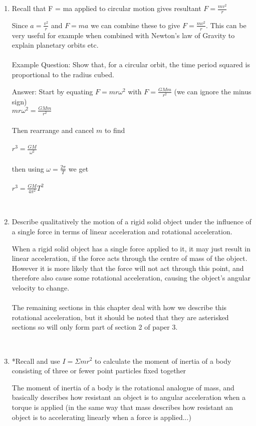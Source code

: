 \documentclass{article}
\begin{document}
\begin {enumerate}
\item Recall that F = ma applied to circular motion gives resultant $F=\frac{mv^2}{r}$

Since $a = \frac{v ^{2}}{r}$ and $F=ma$ we can combine these to give $F=\frac{mv^2}{r}$. This can be very useful for example when combined with Newton's law of Gravity to explain planetary orbits etc.
\\
\\

Example Question: Show that, for a circular orbit, the time period squared is proportional to the radius cubed.

Answer: Start by equating $F=mr\omega^2$ with $F= \frac{GMm}{r^2}$ (we can ignore the minus sign)
\\

$mr\omega^{2}= \frac{GMm}{r^2}$
\\
\\
Then rearrange and cancel $m$ to find
\\
\\
$r^{3}=\frac{GM}{\omega^2}$
\\
\\
then using $\omega=\frac{2\pi}{T}$ we get
\\
\\
$r^{3}=\frac{GM}{4\pi^{2}}T^2$

\
\item Describe qualitatively the motion of a rigid solid object under the influence of a single force in terms of
linear acceleration and rotational acceleration.

When a rigid solid object has a single force applied to it, it may just result in linear acceleration, if the force acts through the centre of mass of the object. However it is more likely that the force will not act through this point, and therefore also cause some rotational acceleration, causing the object's angular velocity to change.  
\\
\\
The remaining sections in this chapter deal with how we describe this rotational acceleration, but it should be noted that they are asterisked sections so will only form part of section 2 of paper 3.

\
\item *Recall and use $I = \Sigma mr^2$ to calculate the moment of inertia of a body consisting of three or fewer point
particles fixed together

The moment of inertia of a body is the rotational analogue of mass, and basically describes how resistant an object is to angular acceleration when a torque is applied (in the same way that mass describes how resistant an object is to accelerating linearly when a force is applied...)


\end{enumerate}
\end{document}
